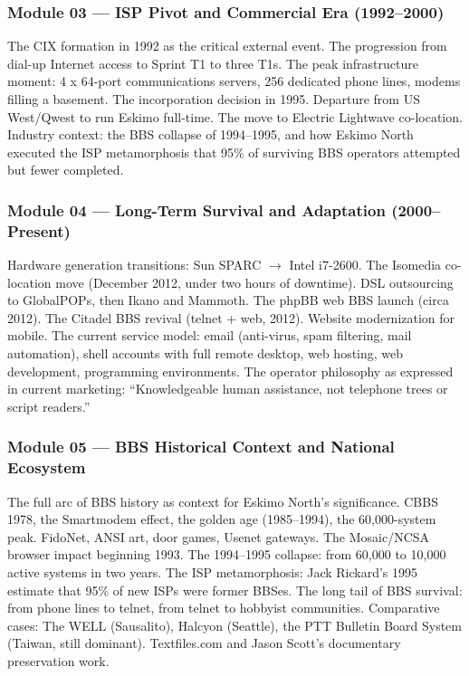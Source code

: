 \documentclass[11pt,letterpaper]{article}
\begin{document}
\subsubsection{Module 03 --- ISP Pivot and Commercial Era (1992--2000)}

The CIX formation in 1992 as the critical external event. The progression from dial-up Internet access to Sprint T1 to three T1s. The peak infrastructure moment: 4 x 64-port communications servers, 256 dedicated phone lines, modems filling a basement. The incorporation decision in 1995. Departure from US West/Qwest to run Eskimo full-time. The move to Electric Lightwave co-location. Industry context: the BBS collapse of 1994--1995, and how Eskimo North executed the ISP metamorphosis that 95\% of surviving BBS operators attempted but fewer completed.

\subsubsection{Module 04 --- Long-Term Survival and Adaptation (2000--Present)}

Hardware generation transitions: Sun SPARC $\rightarrow$ Intel i7-2600. The Isomedia co-location move (December 2012, under two hours of downtime). DSL outsourcing to GlobalPOPs, then Ikano and Mammoth. The phpBB web BBS launch (circa 2012). The Citadel BBS revival (telnet + web, 2012). Website modernization for mobile. The current service model: email (anti-virus, spam filtering, mail automation), shell accounts with full remote desktop, web hosting, web development, programming environments. The operator philosophy as expressed in current marketing: ``Knowledgeable human assistance, not telephone trees or script readers.''

\subsubsection{Module 05 --- BBS Historical Context and National Ecosystem}

The full arc of BBS history as context for Eskimo North's significance. CBBS 1978, the Smartmodem effect, the golden age (1985--1994), the 60,000-system peak. FidoNet, ANSI art, door games, Usenet gateways. The Mosaic/NCSA browser impact beginning 1993. The 1994--1995 collapse: from 60,000 to 10,000 active systems in two years. The ISP metamorphosis: Jack Rickard's 1995 estimate that 95\% of new ISPs were former BBSes. The long tail of BBS survival: from phone lines to telnet, from telnet to hobbyist communities. Comparative cases: The WELL (Sausalito), Halcyon (Seattle), the PTT Bulletin Board System (Taiwan, still dominant). Textfiles.com and Jason Scott's documentary preservation work.
\end{document}
